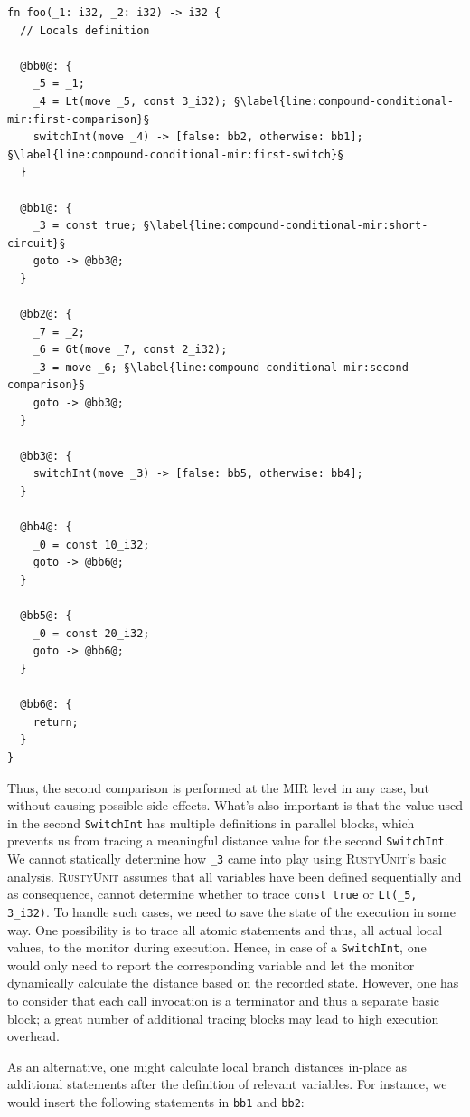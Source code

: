 \documentclass[paper=a4,%
  twoside,%
  BCOR4mm,%
  abstract=true,%
  toc=bibliography,%
  chapterprefix=true,%
  toc=bibliographynumbered,%
  open=right,%
  english,%
  pagesize=pdftex]{scrreprt}
\newcommand{\tech}{\textsc{RustyUnit}\xspace}
\newcommand{\mir}{\ac{MIR}\xspace}
\begin{document}
\begin{lstlisting}[language={MIR}, style=boxed, caption={Expansion of the \texttt{foo}'s conditional expression at the \mir level}, label=lst:compound-conditional-mir-example, escapechar=§]
fn foo(_1: i32, _2: i32) -> i32 {
  // Locals definition

  @bb0@: {
    _5 = _1;
    _4 = Lt(move _5, const 3_i32); §\label{line:compound-conditional-mir:first-comparison}§
    switchInt(move _4) -> [false: bb2, otherwise: bb1]; §\label{line:compound-conditional-mir:first-switch}§
  }

  @bb1@: {
    _3 = const true; §\label{line:compound-conditional-mir:short-circuit}§
    goto -> @bb3@;
  }

  @bb2@: {
    _7 = _2;
    _6 = Gt(move _7, const 2_i32);
    _3 = move _6; §\label{line:compound-conditional-mir:second-comparison}§
    goto -> @bb3@;
  }

  @bb3@: {
    switchInt(move _3) -> [false: bb5, otherwise: bb4];
  }

  @bb4@: {
    _0 = const 10_i32;
    goto -> @bb6@;
  }

  @bb5@: {
    _0 = const 20_i32;
    goto -> @bb6@;
  }

  @bb6@: {
    return;
  }
}
\end{lstlisting}

Thus, the second comparison is performed at the \mir level in any case, but without causing possible side-effects. What's also important is that the value used in the second \texttt{SwitchInt} has multiple definitions in parallel blocks, which prevents us from tracing a meaningful distance value for the second \texttt{SwitchInt}. We cannot statically determine how \texttt{\_3} came into play using \tech's basic analysis. \tech assumes that all variables have been defined sequentially and as consequence, cannot determine whether to trace \texttt{const true} or \texttt{Lt(\_5, 3\_i32)}. To handle such cases, we need to save the state of the execution in some way. One possibility is to trace all atomic statements and thus, all actual local values, to the monitor during execution. Hence, in case of a \texttt{SwitchInt}, one would only need to report the corresponding variable and let the monitor dynamically calculate the distance based on the recorded state. However, one has to consider that each call invocation is a terminator and thus a separate basic block; a great number of additional tracing blocks may lead to high execution overhead.

As an alternative, one might calculate local branch distances in-place as additional statements after the definition of relevant variables. For instance, we would insert the following statements in \texttt{bb1} and \texttt{bb2}:
\end{document}
